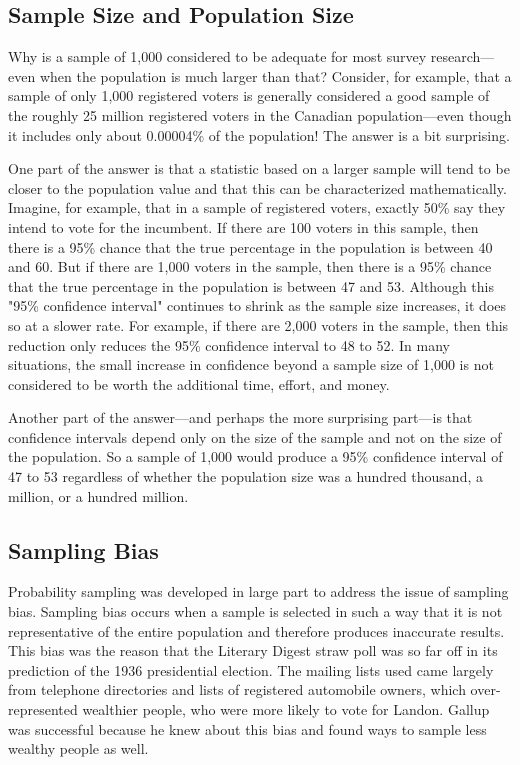 \subsection{Sample Size and Population Size}

Why is a sample of 1,000 considered to be adequate for most survey research---even when the population is much larger than that? Consider, for example, that a sample of only 1,000 registered voters is generally considered a good sample of the roughly 25 million registered voters in the Canadian population---even though it includes only about 0.00004\% of the population! The answer is a bit surprising.

One part of the answer is that a statistic based on a larger sample will tend to be closer to the population value and that this can be characterized mathematically. Imagine, for example, that in a sample of registered voters, exactly 50\% say they intend to vote for the incumbent. If there are 100 voters in this sample, then there is a 95\% chance that the true percentage in the population is between 40 and 60. But if there are 1,000 voters in the sample, then there is a 95\% chance that the true percentage in the population is between 47 and 53. Although this "95\% confidence interval" continues to shrink as the sample size increases, it does so at a slower rate. For example, if there are 2,000 voters in the sample, then this reduction only reduces the 95\% confidence interval to 48 to 52. In many situations, the small increase in confidence beyond a sample size of 1,000 is not considered to be worth the additional time, effort, and money.

Another part of the answer---and perhaps the more surprising part---is that confidence intervals depend only on the size of the sample and not on the size of the population. So a sample of 1,000 would produce a 95\% confidence interval of 47 to 53 regardless of whether the population size was a hundred thousand, a million, or a hundred million.
 

\subsection{Sampling Bias}

Probability sampling was developed in large part to address the issue of sampling bias. Sampling bias occurs when a sample is selected in such a way that it is not representative of the entire population and therefore produces inaccurate results. This bias was the reason that the Literary Digest straw poll was so far off in its prediction of the 1936 presidential election. The mailing lists used came largely from telephone directories and lists of registered automobile owners, which over-represented wealthier people, who were more likely to vote for Landon. Gallup was successful because he knew about this bias and found ways to sample less wealthy people as well.

